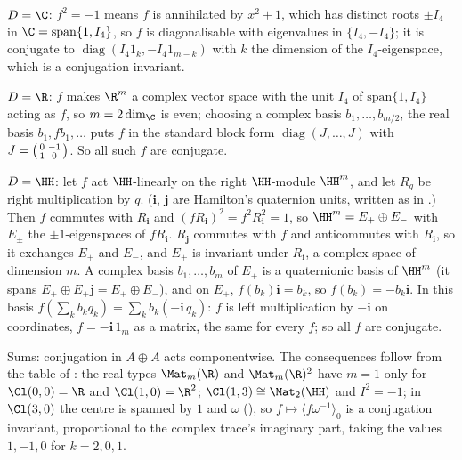 $D = \C$: $f^{2} = -1$ means $f$ is annihilated by $x^{2} + 1$, which has distinct roots $\pm I_4$ in $\C = \mathrm{span}\{1, I_4\}$, so $f$ is diagonalisable with eigenvalues in $\{I_4, -I_4\}$; it is conjugate to $\operatorname{diag}(I_4 1_k, -I_4 1_{m-k})$ with $k$ the dimension of the $I_4$-eigenspace, which is a conjugation invariant.

$D = \R$: $f$ makes $\R^{m}$ a complex vector space with the unit $I_4$ of $\mathrm{span}\{1, I_4\}$ acting as $f$, so $m = 2 \dim_\C$ is even; choosing a complex basis $b_1, \dots, b_{m/2}$, the real basis $b_1, f b_1, \dots$ puts $f$ in the standard block form $\operatorname{diag}(J, \dots, J)$ with $J = \begin{psmallmatrix} 0 & -1 \\ 1 & 0 \end{psmallmatrix}$. So all such $f$ are conjugate.

$D = \HH$: let $f$ act $\HH$-linearly on the right $\HH$-module $\HH^{m}$, and let $R_q$ be right multiplication by $q$. ($\mathbf{i}$, $\mathbf{j}$ are Hamilton's quaternion units, written as in .) Then $f$ commutes with $R_{\mathbf{i}}$ and $(f R_{\mathbf{i}})^{2} = f^{2} R_{\mathbf{i}}^{2} = 1$, so $\HH^{m} = E_+ \oplus E_-$ with $E_\pm$ the $\pm 1$-eigenspaces of $f R_{\mathbf{i}}$. $R_{\mathbf{j}}$ commutes with $f$ and anticommutes with $R_{\mathbf{i}}$, so it exchanges $E_+$ and $E_-$, and $E_+$ is invariant under $R_{\mathbf{i}}$, a complex space of dimension $m$. A complex basis $b_1, \dots, b_m$ of $E_+$ is a quaternionic basis of $\HH^{m}$ (it spans $E_+ \oplus E_+ \mathbf{j} = E_+ \oplus E_-$), and on $E_+$, $f(b_k) \mathbf{i} = b_k$, so $f(b_k) = -b_k \mathbf{i}$. In this basis $f(\sum_k b_k q_k) = \sum_k b_k(-\mathbf{i}\, q_k)$: $f$ is left multiplication by $-\mathbf{i}$ on coordinates, $f = -\mathbf{i}\, 1_m$ as a matrix, the same for every $f$; so all $f$ are conjugate.

Sums: conjugation in $A \oplus A$ acts componentwise. The consequences follow from the table of : the real types $\Mat_m(\R)$ and $\Mat_m(\R)^{2}$ have $m = 1$ only for $\Cl(0,0) = \R$ and $\Cl(1,0) = \R^{2}$; $\Cl(1,3) \cong \Mat_2(\HH)$ and $I^{2} = -1$; in $\Cl(3,0)$ the centre is spanned by $1$ and $\omega$ (), so $f \mapsto \langle f \omega^{-1}\rangle_0$ is a conjugation invariant, proportional to the complex trace's imaginary part, taking the values $1, -1, 0$ for $k = 2, 0, 1$.
